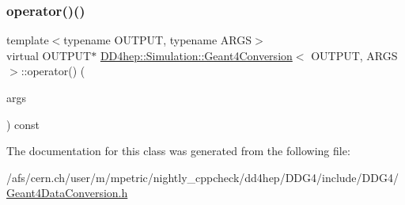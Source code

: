 \hypertarget{class_d_d4hep_1_1_simulation_1_1_geant4_conversion_afab79d045509dd073e3c5d435ff84dc2}{}\label{class_d_d4hep_1_1_simulation_1_1_geant4_conversion_afab79d045509dd073e3c5d435ff84dc2} 
\subsubsection{\texorpdfstring{operator()()}{operator()()}}
{\footnotesize\ttfamily template$<$typename O\+U\+T\+P\+UT, typename A\+R\+GS$>$ \\
virtual O\+U\+T\+P\+UT$\ast$ \hyperlink{class_d_d4hep_1_1_simulation_1_1_geant4_conversion}{D\+D4hep\+::\+Simulation\+::\+Geant4\+Conversion}$<$ O\+U\+T\+P\+UT, A\+R\+GS $>$\+::operator() (\begin{DoxyParamCaption}\item[{const A\+R\+GS \&}]{args }\end{DoxyParamCaption}) const\hspace{0.3cm}{\ttfamily [pure virtual]}}



The documentation for this class was generated from the following file\+:\begin{DoxyCompactItemize}
\item 
/afs/cern.\+ch/user/m/mpetric/nightly\+\_\+cppcheck/dd4hep/\+D\+D\+G4/include/\+D\+D\+G4/\hyperlink{_geant4_data_conversion_8h}{Geant4\+Data\+Conversion.\+h}\end{DoxyCompactItemize}
